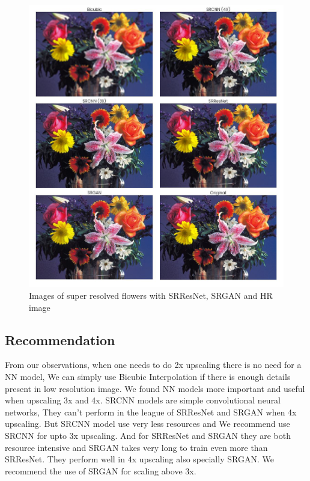     \begin{figure}
        \centering
        \includegraphics[width=5.5in]{./figures/examples/flowers.jpg}
        \caption{Images of super resolved flowers  with SRResNet, SRGAN and HR image}
    \end{figure}       
  
\clearpage
\newpage
\subsection{Recommendation}
From our observations, when one needs to do 2x upscaling there is no need for a NN model, We can simply use Bicubic Interpolation if there is enough details present in low resolution image. We found NN models more important and useful when upscaling 3x and 4x. SRCNN models are simple convolutional neural networks, They can't perform in the league of SRResNet and SRGAN when 4x upscaling. But SRCNN model use very less resources and We recommend use SRCNN for upto 3x upscaling. And for SRResNet and SRGAN they are both resource intensive and SRGAN takes very long to train even more than SRResNet. They perform well in 4x upscaling also specially SRGAN. We recommend the use of SRGAN for scaling above 3x.
